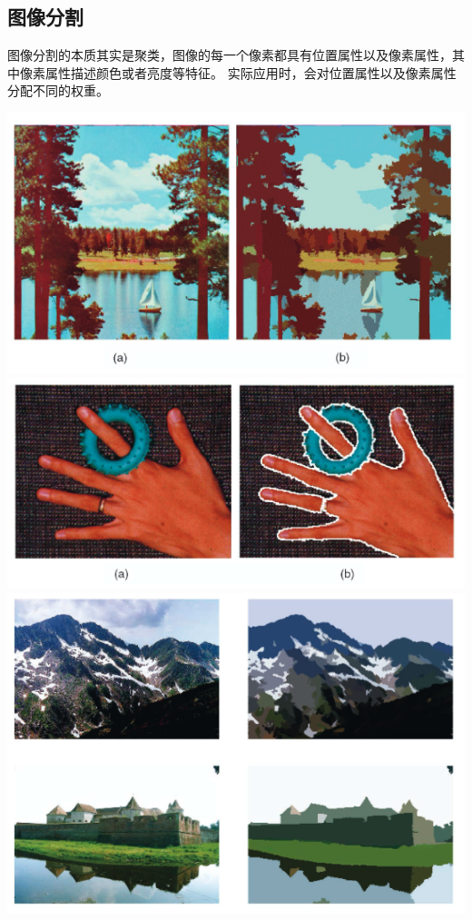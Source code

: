 \documentclass{article}
\begin{document}
\subsection{图像分割}
图像分割的本质其实是聚类，图像的每一个像素都具有位置属性以及像素属性，其中像素属性描述颜色或者亮度等特征。
实际应用时，会对位置属性以及像素属性分配不同的权重。
\begin{center}
    \includegraphics[width=\textwidth]{Images/segmentation1.png}
    \includegraphics[width=\textwidth]{Images/segmentation2.png}
    \includegraphics[width=\textwidth]{Images/segmentation3.png}

\end{center}
\end{document}
